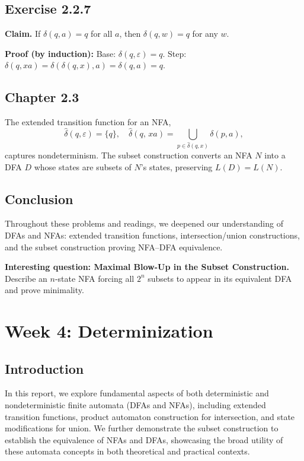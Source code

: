 \documentclass{article}
\theoremstyle{theorem}
\theoremstyle{definition}
\theoremstyle{remark}
\begin{document}
\subsection{Exercise 2.2.7}
\textbf{Claim.} If \(\delta(q,a)=q\) for all \(a\), then \(\delta(q,w)=q\) for any \(w\).

\textbf{Proof (by induction):}
Base: \(\delta(q,\varepsilon)=q\).  
Step: \(\delta(q,xa)=\delta(\delta(q,x),a)=\delta(q,a)=q\).

\subsection{Chapter 2.3}
The extended transition function for an NFA,
\[
  \hat{\delta}(q,\varepsilon)=\{q\},\quad
  \hat{\delta}(q,\,xa)=\bigcup_{p\in\hat{\delta}(q,x)}\delta(p,a),
\]
captures nondeterminism.  The subset construction converts an NFA \(N\) into a DFA \(D\) whose states are subsets of \(N\)’s states, preserving \(L(D)=L(N)\).

\subsection{Conclusion}
Throughout these problems and readings, we deepened our understanding of DFAs and NFAs: extended transition functions, intersection/union constructions, and the subset construction proving NFA–DFA equivalence.

\textbf{Interesting question: Maximal Blow-Up in the Subset Construction.}\\
Describe an \(n\)-state NFA forcing all \(2^n\) subsets to appear in its equivalent DFA and prove minimality.

\section{Week 4: Determinization}

\subsection{Introduction}
In this report, we explore fundamental aspects of both deterministic and nondeterministic finite automata (DFAs and NFAs), including extended transition functions, product automaton construction for intersection, and state modifications for union. We further demonstrate the subset construction to establish the equivalence of NFAs and DFAs, showcasing the broad utility of these automata concepts in both theoretical and practical contexts.
\end{document}
